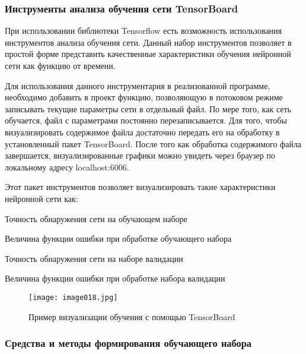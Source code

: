 \subsubsection{Инструменты анализа обучения сети TensorBoard}

При использовании библиотеки Tensorflow есть возможность использования инструментов анализа обучения сети. Данный набор инструментов позволяет в простой форме представить качественные характеристики обучения нейронной сети как функцию от времени. 

Для использования данного инструментария в реализованной программе, необходимо добавить в проект функцию, позволяющую в потоковом режиме записывать текущие параметры сети в отдельный файл. По мере того, как сеть обучается, файл с параметрами постоянно перезаписывается. Для того, чтобы визуализировать содержимое файла достаточно передать его на обработку в установленный пакет TensorBoard. После того как обработка содержимого файла завершается, визуализированные графики можно увидеть через браузер по локальному адресу localhost:6006.

Этот пакет инструментов позволяет визуализировать такие характеристики нейронной сети как:
%
\begin{itemize*}
  \item Точность обнаружения сети на обучающем наборе
  \item Величина функции ошибки при обработке обучающего набора
  \item Точность обнаружения сети на наборе валидации
  \item Величина функции ошибки при обработке набора валидации
\end{itemize*}
%

\begin{figure}[htbp]
\centering
\texttt{[image: image018.jpg]}
\caption{Пример визуализации обучения с помощью TensorBoard}%
\label{fig:how-to-do-research}
\end{figure}

\subsubsection{Средства и методы формирования обучающего набора}

